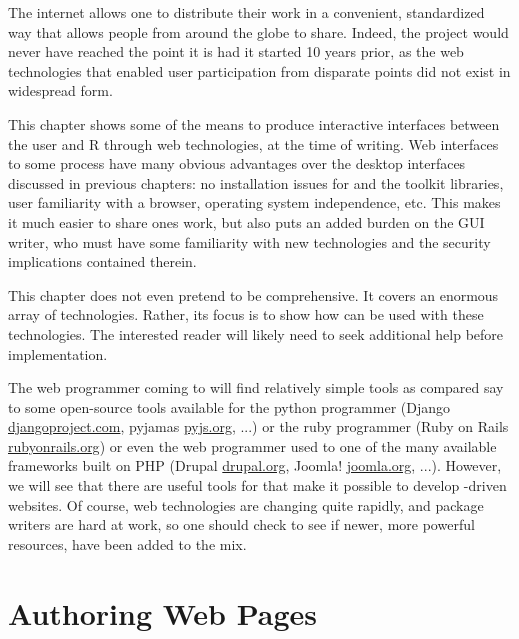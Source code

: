 


The internet allows one to distribute their work in a convenient,
standardized way that allows people from around the globe to
share. Indeed, the \R\/ project would never have reached the
point it is had it started 10 years prior, as the web technologies
that enabled user participation from disparate points did not exist in
widespread form.

This chapter shows some of the means to produce interactive interfaces
between the user and R through web technologies, at the time of
writing. Web interfaces to some process have many obvious advantages
over the desktop interfaces discussed in previous chapters: no
installation issues for \R\/ and the toolkit libraries, user
familiarity with a browser, operating system independence, etc. This
makes it much easier to share ones work, but also puts an added burden
on the GUI writer, who must have some familiarity with new
technologies and the security implications contained therein. 

This chapter does not even pretend to be comprehensive. It covers an
enormous array of technologies. Rather, its focus is to show how \R\/
can be used with these technologies. The interested reader will likely
need to seek additional help before implementation.

The web programmer coming to \R\/ will find relatively simple tools as
compared say to some open-source tools available for the python
programmer (Django \url{djangoproject.com}, pyjamas \url{pyjs.org},
...) or the ruby programmer (Ruby on Rails \url{rubyonrails.org}) or
even the web programmer used to one of the many available frameworks
built on PHP (Drupal \url{drupal.org}, Joomla! \url{joomla.org},
...). However, we will see that there are useful tools for \R\/ that
make it possible to develop \R-driven websites. Of course, web
technologies are changing quite rapidly, and \R\/ package writers are
hard at work, so one should check to see if newer, more powerful
resources, have been added to the mix.

\section{Authoring Web Pages}
\label{sec:authoring-web-pages}




